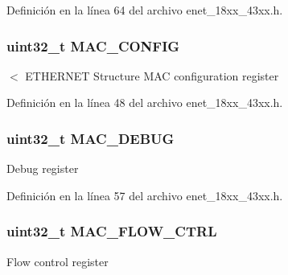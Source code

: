 Definición en la línea 64 del archivo enet\+\_\+18xx\+\_\+43xx.\+h.

\subsubsection[{\texorpdfstring{M\+A\+C\+\_\+\+C\+O\+N\+F\+IG}{MAC_CONFIG}}]{ uint32\+\_\+t M\+A\+C\+\_\+\+C\+O\+N\+F\+IG}\hypertarget{struct_l_p_c___e_n_e_t___t_aff742ee6d4fa89e5b2fc8c9102afe19d}{}\label{struct_l_p_c___e_n_e_t___t_aff742ee6d4fa89e5b2fc8c9102afe19d}
$<$ E\+T\+H\+E\+R\+N\+ET Structure M\+AC configuration register 

Definición en la línea 48 del archivo enet\+\_\+18xx\+\_\+43xx.\+h.

\subsubsection[{\texorpdfstring{M\+A\+C\+\_\+\+D\+E\+B\+UG}{MAC_DEBUG}}]{ uint32\+\_\+t M\+A\+C\+\_\+\+D\+E\+B\+UG}\hypertarget{struct_l_p_c___e_n_e_t___t_a91d92f7bb3d1ac0cf1acbcab4f0cb1ad}{}\label{struct_l_p_c___e_n_e_t___t_a91d92f7bb3d1ac0cf1acbcab4f0cb1ad}
Debug register 

Definición en la línea 57 del archivo enet\+\_\+18xx\+\_\+43xx.\+h.

\subsubsection[{\texorpdfstring{M\+A\+C\+\_\+\+F\+L\+O\+W\+\_\+\+C\+T\+RL}{MAC_FLOW_CTRL}}]{ uint32\+\_\+t M\+A\+C\+\_\+\+F\+L\+O\+W\+\_\+\+C\+T\+RL}\hypertarget{struct_l_p_c___e_n_e_t___t_a460b81474c00863d205877ff830ec1e2}{}\label{struct_l_p_c___e_n_e_t___t_a460b81474c00863d205877ff830ec1e2}
Flow control register 

